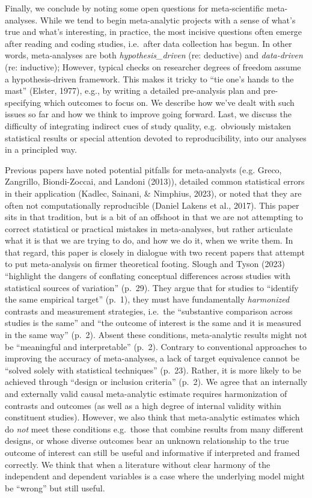 \documentclass[
  man]{apa6}
\begin{document}
Finally, we conclude by noting some open questions for meta-scientific meta-analyses. While we tend to begin meta-analytic projects with a sense of what's true and what's interesting, in practice, the most incisive questions often emerge after reading and coding studies, i.e.~after data collection has begun. In other words, meta-analyses are both \emph{hypothesis\_driven} (re: deductive) and \emph{data-driven} (re: inductive); However, typical checks on researcher degrees of freedom assume a hypothesis-driven framework. This makes it tricky to ``tie one's hands to the mast'' (Elster, 1977), e.g., by writing a detailed pre-analysis plan and pre-specifying which outcomes to focus on. We describe how we've dealt with such issues so far and how we think to improve going forward. Last, we discuss the difficulty of integrating indirect cues of study quality, e.g.~obviously mistaken statistical results or special attention devoted to reproducibility, into our analyses in a principled way.

Previous papers have noted potential pitfalls for meta-analysts (e.g. Greco, Zangrillo, Biondi-Zoccai, and Landoni (2013)), detailed common statistical errors in their application (Kadlec, Sainani, \& Nimphius, 2023), or noted that they are often not computationally reproducible (Daniel Lakens et al., 2017). This paper sits in that tradition, but is a bit of an offshoot in that we are not attempting to correct statistical or practical mistakes in meta-analyses, but rather articulate what it is that we are trying to do, and how we do it, when we write them. In that regard, this paper is closely in dialogue with two recent papers that attempt to put meta-analysis on firmer theoretical footing. Slough and Tyson (2023) ``highlight the dangers of conflating conceptual differences across studies with statistical sources of variation'' (p.~29). They argue that for studies to ``identify the same empirical target'' (p.~1), they must have fundamentally \emph{harmonized} contrasts and measurement strategies, i.e.~the ``substantive comparison across studies is the same'' and ``the outcome of interest is the same and it is measured in the same way'' (p.~2). Absent these conditions, meta-analytic results might not be ``meaningful and interpretable'' (p.~2). Contrary to conventional approaches to improving the accuracy of meta-analyses, a lack of target equivalence cannot be ``solved solely with statistical techniques'' (p.~23). Rather, it is more likely to be achieved through ``design or inclusion criteria'' (p.~2). We agree that an internally and externally valid causal meta-analytic estimate requires harmonization of contrasts and outcomes (as well as a high degree of internal validity within constituent studies). However, we also think that meta-analytic estimates which do \emph{not} meet these conditions \textemdash e.g.~those that combine results from many different designs, or whose diverse outcomes bear an unknown relationship to the true outcome of interest \textemdash can still be useful and informative if interpreted and framed correctly. We think that when a literature without clear harmony of the independent and dependent variables is a case where the underlying model might be ``wrong'' but still useful.
\end{document}
